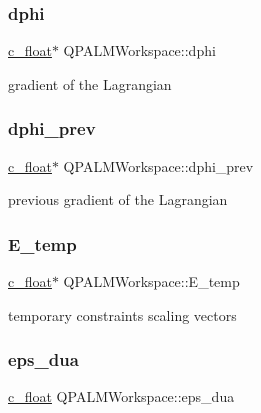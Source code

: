 \subsubsection{\texorpdfstring{dphi}{dphi}}
{\footnotesize\ttfamily \mbox{\hyperlink{global__opts_8h_a7f1a9fda95e52979658c20a0d134fb15}{c\+\_\+float}}$\ast$ Q\+P\+A\+L\+M\+Workspace\+::dphi}



gradient of the Lagrangian 

\mbox{\label{structQPALMWorkspace_a93d1329aebe7dba2d38645412de43f92}} 
\subsubsection{\texorpdfstring{dphi\_prev}{dphi\_prev}}
{\footnotesize\ttfamily \mbox{\hyperlink{global__opts_8h_a7f1a9fda95e52979658c20a0d134fb15}{c\+\_\+float}}$\ast$ Q\+P\+A\+L\+M\+Workspace\+::dphi\+\_\+prev}



previous gradient of the Lagrangian 

\mbox{\label{structQPALMWorkspace_ac7d0355a7c31ec062df981ff4b8199f8}} 
\subsubsection{\texorpdfstring{E\_temp}{E\_temp}}
{\footnotesize\ttfamily \mbox{\hyperlink{global__opts_8h_a7f1a9fda95e52979658c20a0d134fb15}{c\+\_\+float}}$\ast$ Q\+P\+A\+L\+M\+Workspace\+::\+E\+\_\+temp}



temporary constraints scaling vectors 

\mbox{\label{structQPALMWorkspace_a66248f1ef4c0895a8a21afefacfd92f1}} 
\subsubsection{\texorpdfstring{eps\_dua}{eps\_dua}}
{\footnotesize\ttfamily \mbox{\hyperlink{global__opts_8h_a7f1a9fda95e52979658c20a0d134fb15}{c\+\_\+float}} Q\+P\+A\+L\+M\+Workspace\+::eps\+\_\+dua}




